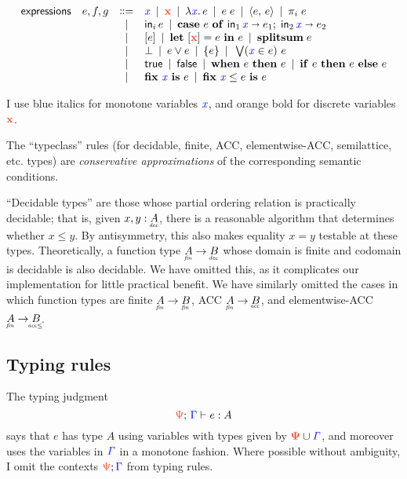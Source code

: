 \documentclass{article}
\begin{document}
\[\begin{array}{rccl}
  \textsf{expressions} & e,f,g
  &\bnfeq& \m{x} \pipe \d{x} \pipe \lam{\m{x}} e \pipe e\; e
  \pipe \pair{e}{e} \pipe \pi_i\; e\\
  &&\pipe& \inj{i}{e} \pipe \case{e}{\m{x}}{e_1}{\m{x}}{e_2}\\
  &&\pipe& \disc{e} \pipe \letdisc{\d{x}}{e}{e} \pipe \splitsum{e}\\
  &&\pipe& \unit \pipe e \vee e \pipe \single{e} \pipe \setelim{\m{x}}{e}{e}\\
  &&\pipe& \etrue \pipe \efalse \pipe \when{e}{e} \pipe \ifthen{e}{e}{e}\\
  &&\pipe& \fix{\m{x}}{e} \pipe \fixle{\m{x}}{e}{e}
\end{array}
\]

I use blue italics for monotone variables ${\color{blue}{\mathit{x}}}$, and orange bold for discrete variables $\d{x}$.

The ``typeclass'' rules (for decidable, finite, ACC, elementwise-ACC, semilattice, etc.\! types) are \emph{conservative approximations} of the corresponding semantic conditions.

``Decidable types'' are those whose partial ordering relation is practically decidable; that is, given $x, y : \eq{A}$, there is a reasonable algorithm that determines whether $x \le y$.
%
By antisymmetry, this also makes equality $x = y$ testable at these types. Theoretically, a function type $\under{fin}{A} \to \eq{B}$ whose domain is finite and codomain is decidable is also decidable.
%
We have omitted this, as it complicates our implementation for little practical
benefit.
%
We have similarly omitted the cases in which function types are finite $\fin{A} \to \fin{B}$, ACC $\fin{A} \to \acc{B}$, and elementwise-ACC $\fin{A} \to \eltacc{B}$.


\subsection{Typing rules}

The typing judgment \[\J{\GP}{\GG}{e}{A}\] says that $e$ has type $A$ using variables with types given by $\d{\GP} \cup \m{\GG}$, and moreover uses the variables in ${\color{blue}{\mathit{\Gamma}}}$ in a monotone fashion.
%
Where possible without ambiguity, I omit the contexts $\dt{\GP};\mt{\GG}$ from typing rules.
\end{document}

